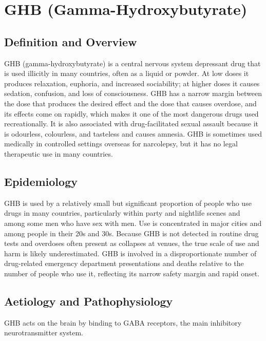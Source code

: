 \chapter{GHB (Gamma-Hydroxybutyrate)}

\section*{Definition and Overview}
GHB (gamma-hydroxybutyrate) is a central nervous system depressant drug that is used illicitly in many countries, often as a liquid or powder. At low doses it produces relaxation, euphoria, and increased sociability; at higher doses it causes sedation, confusion, and loss of consciousness. GHB has a narrow margin between the dose that produces the desired effect and the dose that causes overdose, and its effects come on rapidly, which makes it one of the most dangerous drugs used recreationally. It is also associated with drug-facilitated sexual assault because it is odourless, colourless, and tasteless and causes amnesia. GHB is sometimes used medically in controlled settings overseas for narcolepsy, but it has no legal therapeutic use in many countries.

\section*{Epidemiology}
GHB is used by a relatively small but significant proportion of people who use drugs in many countries, particularly within party and nightlife scenes and among some men who have sex with men. Use is concentrated in major cities and among people in their 20s and 30s. Because GHB is not detected in routine drug tests and overdoses often present as collapses at venues, the true scale of use and harm is likely underestimated. GHB is involved in a disproportionate number of drug-related emergency department presentations and deaths relative to the number of people who use it, reflecting its narrow safety margin and rapid onset.

\section*{Aetiology and Pathophysiology}
GHB acts on the brain by binding to GABA receptors, the main inhibitory neurotransmitter system.

